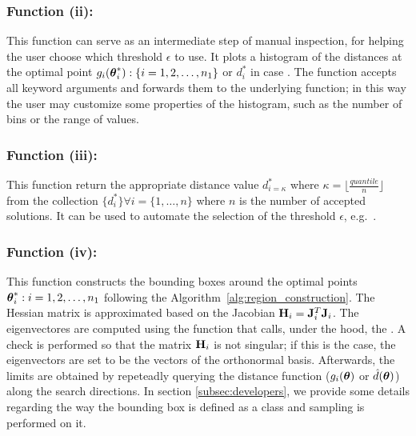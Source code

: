 \subsubsection*{Function (ii): }

This function can serve as an intermediate step of manual inspection,
for helping the user choose which threshold $\epsilon$ to use. It
plots a histogram of the distances at the optimal point
$g_i(\boldsymbol{\theta}_i^*) : \{i = 1, 2, \ldots, n_1\}$ or
$d_i^*$ in case . The function accepts all
keyword arguments and forwards them to the underlying
 function; in this way the user may
customize some properties of the histogram, such as the number of bins
or the range of values.

\subsubsection*{Function (iii): }

This function return the appropriate distance value $d_{i=\kappa}^*$
where $\kappa = \lfloor \frac{quantile}{n} \rfloor$ from the
collection $\{ d_i^* \} \forall i = \{1, \ldots, n\}$ where $n$ is the
number of accepted solutions. It can be used to automate the selection
of the threshold $\epsilon$, e.g.\
.

\subsubsection*{Function (iv): }

This function constructs the bounding boxes around the optimal points
$\boldsymbol{\theta}_i^* : i = 1, 2, \ldots, n_1$ following the
Algorithm~\ref{alg:region_construction}. The Hessian matrix is
approximated based on the Jacobian $\mathbf{H}_i = \mathbf{J}_i^T \mathbf{J}_i$. The
eigenvectores are computed using the function
 that calls, under the hood, the
. A check is performed so that the matrix
$\mathbf{H}_i$ is not singular; if this is the case, the eigenvectors are
set to be the vectors of the orthonormal basis. Afterwards, the limits
are obtained by repeteadly querying the distance function
($g_i(\boldsymbol{\theta})$ or $\hat{d}(\boldsymbol{\theta})$) along the search directions. In
section \ref{subsec:developers}, we provide some details regarding the
way the bounding box is defined as a class and sampling is performed
on it.


